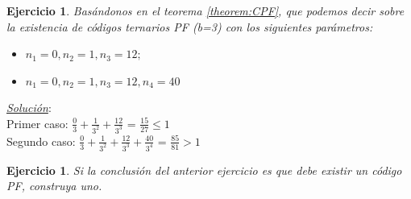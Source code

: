 \documentclass{beamer}
\newtheorem{ejercicio} [Corolario]{Ejercicio}
\begin{document}


\begin{frame}      \small
 
 \begin{ejercicio}

Basándonos en el teorema \ref{theorem:CPF}, que podemos decir sobre la existencia de códigos ternarios PF (b=3) con los siguientes parámetros:

\begin{itemize}
\item $n_1 =0,n_2 =1,n_3 =12;$
\item $n_1 =0,n_2 =1,n_3 =12,n_4 =40$
\end{itemize}

\end{ejercicio}
\pause

\textit{\underline{Solución}}:\\

Primer caso: $\frac{0}{3} + \frac{1}{3^2}+ \frac{12}{3^3}$ = $\frac{15}{27}\leqslant 1$\\

Segundo caso: $\frac{0}{3} + \frac{1}{3^2}+ \frac{12}{3^3}+ \frac{40}{3^4}$ = $\frac{85}{81} > 1$


\pause
 \begin{ejercicio}

Si la conclusión del anterior ejercicio es que debe existir un código PF, construya uno.

\end{ejercicio}

\end{frame}

\end{document}
